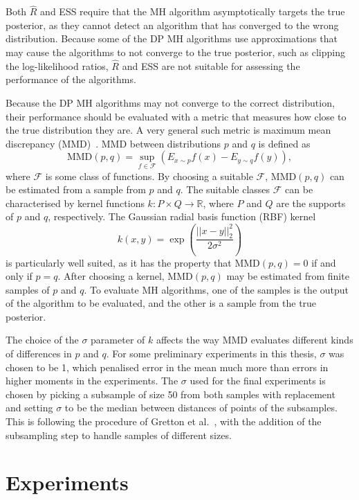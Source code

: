 \documentclass[english,twoside,openright]{HYgraduMLDS}
\newcommand{\R}{\mathbb{R}}
\begin{document}
Both \(\hat{R}\) and ESS require that the MH algorithm asymptotically targets
the true posterior, as they cannot detect an algorithm that has converged to the 
wrong distribution. Because some of the DP MH algorithms use approximations
that may cause the algorithms to not converge to the true posterior, 
such as clipping the log-likelihood ratios, \(\hat{R}\) and ESS are not suitable
for assessing the performance of the algorithms.

Because the DP MH algorithms may not converge to the correct distribution,
their performance should be evaluated with a metric that measures how close 
to the true distribution they are. A very general such metric is maximum mean
discrepancy (MMD)~\cite{GrettonBRSS12}. MMD between distributions \(p\) and \(q\) 
is defined as 
\[
    \mathrm{MMD}(p, q) = \sup_{f\in \mathcal{F}}(E_{x\sim p}f(x) - E_{y\sim q}f(y)),
\]
where \(\mathcal{F}\) is some class of functions. By 
choosing a suitable \(\mathcal{F}\), \(\mathrm{MMD}(p, q)\) can be estimated from a 
sample from \(p\) and \(q\). The suitable classes \(\mathcal{F}\) can be 
characterised by kernel functions \(k\colon P\times Q \to \R\), where
\(P\) and \(Q\) are the supports of \(p\) and \(q\), respectively.
The Gaussian radial basis function (RBF) kernel 
\[
    k(x, y) = \exp\left(\frac{||x - y||_2^2}{2\sigma^2}\right)
\]
is particularly well suited, as it has the property that 
\(\mathrm{MMD}(p, q) = 0\) if and only if \(p = q\). After choosing a kernel,
\(\mathrm{MMD}(p, q)\) may be estimated from finite samples of \(p\) and \(q\).
To evaluate MH algorithms, one of the samples is the output of the algorithm
to be evaluated, and the other is a sample from the true posterior.

The choice of the \(\sigma\) parameter of \(k\) affects the way MMD evaluates 
different kinds of differences in \(p\) and \(q\). For some preliminary experiments
in this thesis, \(\sigma\) was chosen to be 1, which penalised error in the 
mean much more than errors in higher moments in the experiments. 
The \(\sigma\) used for the final experiments is chosen by picking a subsample
of size 50
from both samples with replacement and setting \(\sigma\) to be the median 
between distances of points of the subsamples. This is following the procedure of 
Gretton et al.~\cite{GrettonBRSS12}, with the addition of the subsampling step
to handle samples of different sizes.

\chapter{Experiments}\label{experiment_chapter}
\end{document}
